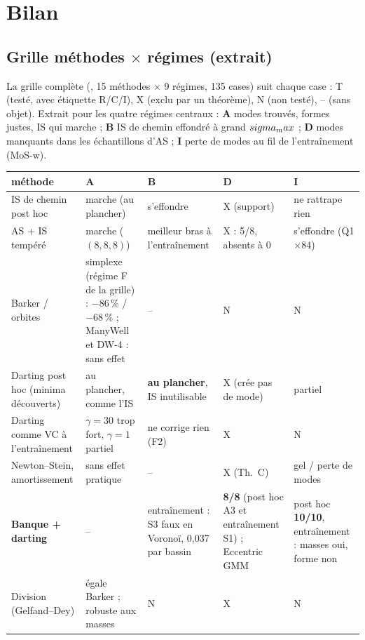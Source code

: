 \section{Bilan}
\label{sec:bilan}

\subsection{Grille méthodes $\times$ régimes (extrait)}
La grille complète (, 15 méthodes $\times$ 9 régimes, 135 cases) suit chaque case : T (testé, avec étiquette R/C/I), X (exclu par un théorème), N (non testé), -- (sans objet). Extrait pour les quatre régimes centraux : \textbf{A} modes trouvés, formes justes, IS qui marche ; \textbf{B} IS de chemin effondré à grand $sigma_max$ ; \textbf{D} modes manquants dans les échantillons d'AS ; \textbf{I} perte de modes au fil de l'entraînement (MoS-w).
\begin{table}[h]\centering\footnotesize
\begin{tabularx}{\linewidth}{>{\raggedright\arraybackslash}p{3.0cm}*{4}{>{\raggedright\arraybackslash}X}}\toprule
méthode & A & B & D & I\\\midrule
IS de chemin post hoc & marche (au plancher) & s'effondre & X (support) & ne rattrape rien\\
AS + IS tempéré & marche ($(8,8,8)$) & meilleur bras à l'entraînement & X : 5/8, absents à 0 & s'effondre (Q1 $\times84$)\\
Barker / orbites & simplexe (régime F de la grille) : $-86\,\%$ / $-68\,\%$ ; ManyWell et DW-4 : sans effet & -- & N & N\\
Darting post hoc (minima découverts) & au plancher, comme l'IS & \textbf{au plancher}, IS inutilisable & X (crée pas de mode) & partiel\\
Darting comme VC à l'entraînement & $\gamma=30$ trop fort, $\gamma=1$ partiel & ne corrige rien (F2) & X & N\\
Newton--Stein, amortissement & sans effet pratique & -- & X (Th.~C) & gel / perte de modes\\
\textbf{Banque + darting} & -- & entraînement : S3 faux en Voronoï, 0,037 par bassin & \textbf{8/8} (post hoc A3 et entraînement S1) ; Eccentric GMM & post hoc \textbf{10/10}, entraînement : masses oui, forme non\\
Division (Gelfand--Dey) & égale Barker ; robuste aux masses & N & X & N\\\bottomrule
\end{tabularx}
\end{table}

